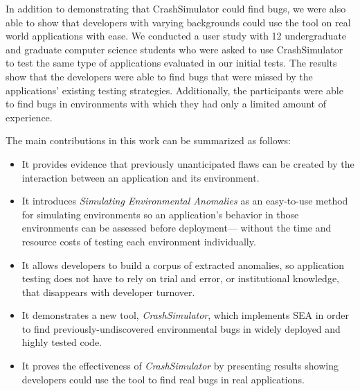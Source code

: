 In addition to demonstrating that
CrashSimulator could find bugs, we were also able to
show that developers with varying backgrounds
could use the tool
on real world applications with ease.
We conducted a user study with
12 undergraduate and graduate computer science students
who were asked to use CrashSimulator to test
the same type of applications evaluated in our initial tests.
The results show that the developers were able to find bugs
that were missed by the applications' existing testing strategies.
Additionally, the
participants were able to find bugs
in environments with which they had only a limited amount of experience.

The main contributions in this work can be summarized as follows:

\begin{itemize}

\item{It provides evidence
that previously unanticipated flaws can be created by the interaction
between an application and its environment.}

\item{It introduces \textit{Simulating Environmental Anomalies}
as an easy-to-use method for simulating environments
so an application's behavior in those environments
can be assessed before deployment---
without the time and resource costs of
testing each environment individually.}

\item{It allows developers to build a corpus of extracted anomalies, so
    application testing does not have to rely on trial and error,
    or institutional knowledge,
    that disappears with developer turnover.}

\item{It demonstrates a new tool, {\em CrashSimulator},
which implements SEA
in order to find previously-undiscovered environmental bugs
in widely deployed and highly tested code.}

\item{It proves the effectiveness
of {\em CrashSimulator}
by presenting results
showing developers
could use the tool to find real bugs in real applications.}

\end{itemize}
